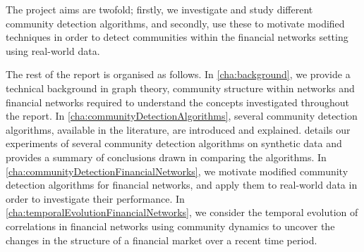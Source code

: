 The project aims are twofold; firstly, we investigate and study different community detection algorithms, and secondly, use these to motivate modified techniques in order to detect communities within the financial networks setting using real-world data.

The rest of the report is organised as follows.
In \cref{cha:background}, we provide a technical background in graph theory, community structure within networks and financial networks required to understand the concepts investigated throughout the report.
In \cref{cha:communityDetectionAlgorithms}, several community detection algorithms, available in the literature, are introduced and explained.
 details our experiments of several community detection algorithms on synthetic data and provides a summary of conclusions drawn in comparing the algorithms.
In \cref{cha:communityDetectionFinancialNetworks}, we motivate modified community detection algorithms for financial networks, and apply them to real-world data in order to investigate their performance.
In \cref{cha:temporalEvolutionFinancialNetworks}, we consider the temporal evolution of correlations in financial networks using community dynamics to uncover the changes in the structure of a financial market over a recent time period.